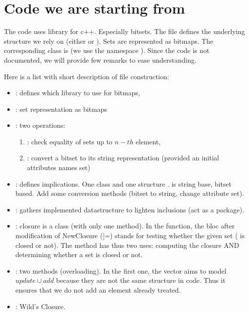 \section{Code we are starting from}

The code uses  library for c++. Especially bitsets. The file 
 defines the underlying structure we rely on (either 
 or ). Sets are represented as bitmaps. The 
corresponding class is  (we use the namespace ).
Since the code is not documented, we will provide few remarks to ease
understanding.

Here is a list with short description of file construction:
\begin{itemize}
	\item {}: defines which library to use for bitmaps,
	\item {}: set representation as bitmaps
	\item {}: two operations:
		\begin{enumerate}
			\item {}: check equality of sets up to $n-th$
			element,
			\item {}: convert a bitset to its string representation
			(provided an initial attributes names set)
		\end{enumerate}
	\item {}: defines implications. One 
	class and one structure .  is string
	base,  bitset based. Add some conversion methods (bitset
	to string, change attribute set).
	
	\item {}: gathers implemented datastructure to lighten
	inclusions (act as a package).
	
	\item {}: closure is a class (with only one method). In
	the  function, the  bloc after 
	modification of NewClosure (|=) stands for testing whether the given set
	( is closed or not). The method has thus two uses: computing
	the closure AND determining whether a set is closed or not.
	
	\item {}: two methods  (overloading). In the
	first one, the  vector  aims to model $update \cup add$
	because they are not the same structure in code. Thus it ensures that we do
	not add an element already treated.
	
	\item {}: Wild's Closure.
	
\end{itemize}